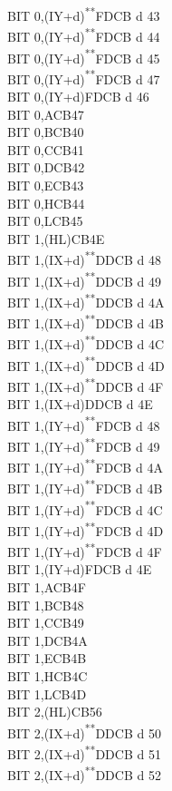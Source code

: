 \documentclass[12pt,twoside,openright,a4paper]{book}
\newcommand{\UNDOC}{\textnormal{\textsuperscript{**}}}
\begin{document}
\begin{multicols}{3}
{\begin{tabbing}
	BIT 0,(IY+d)\UNDOC\>FDCB d 43\\
	BIT 0,(IY+d)\UNDOC\>FDCB d 44\\
	BIT 0,(IY+d)\UNDOC\>FDCB d 45\\
	BIT 0,(IY+d)\UNDOC\>FDCB d 47\\
	BIT 0,(IY+d)\>FDCB d 46\\
	BIT 0,A\>CB47\\
	BIT 0,B\>CB40\\
	BIT 0,C\>CB41\\
	BIT 0,D\>CB42\\
	BIT 0,E\>CB43\\
	BIT 0,H\>CB44\\
	BIT 0,L\>CB45\\
	BIT 1,(HL)\>CB4E\\
	BIT 1,(IX+d)\UNDOC\>DDCB d 48\\
	BIT 1,(IX+d)\UNDOC\>DDCB d 49\\
	BIT 1,(IX+d)\UNDOC\>DDCB d 4A\\
	BIT 1,(IX+d)\UNDOC\>DDCB d 4B\\
	BIT 1,(IX+d)\UNDOC\>DDCB d 4C\\
	BIT 1,(IX+d)\UNDOC\>DDCB d 4D\\
	BIT 1,(IX+d)\UNDOC\>DDCB d 4F\\
	BIT 1,(IX+d)\>DDCB d 4E\\
	BIT 1,(IY+d)\UNDOC\>FDCB d 48\\
	BIT 1,(IY+d)\UNDOC\>FDCB d 49\\
	BIT 1,(IY+d)\UNDOC\>FDCB d 4A\\
	BIT 1,(IY+d)\UNDOC\>FDCB d 4B\\
	BIT 1,(IY+d)\UNDOC\>FDCB d 4C\\
	BIT 1,(IY+d)\UNDOC\>FDCB d 4D\\
	BIT 1,(IY+d)\UNDOC\>FDCB d 4F\\
	BIT 1,(IY+d)\>FDCB d 4E\\
	BIT 1,A\>CB4F\\
	BIT 1,B\>CB48\\
	BIT 1,C\>CB49\\
	BIT 1,D\>CB4A\\
	BIT 1,E\>CB4B\\
	BIT 1,H\>CB4C\\
	BIT 1,L\>CB4D\\
	BIT 2,(HL)\>CB56\\
	BIT 2,(IX+d)\UNDOC\>DDCB d 50\\
	BIT 2,(IX+d)\UNDOC\>DDCB d 51\\
	BIT 2,(IX+d)\UNDOC\>DDCB d 52\\

\end{tabbing}}
\end{multicols}
\end{document}
